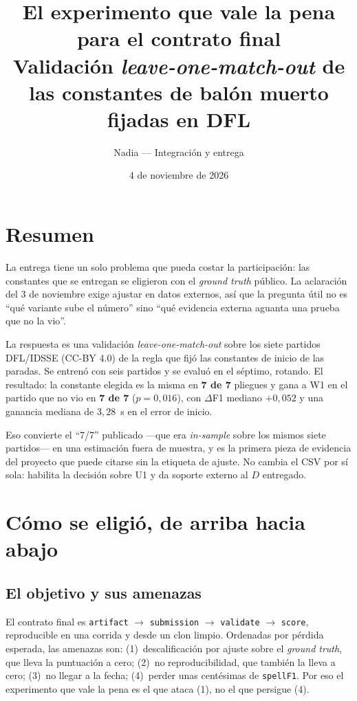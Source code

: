 \documentclass[11pt,a4paper]{article}
\title{El experimento que vale la pena para el contrato final\\
\large Validación \emph{leave-one-match-out} de las constantes de balón muerto fijadas en DFL}
\author{Nadia --- Integración y entrega}
\date{4 de noviembre de 2026}
\begin{document}
\maketitle

\section{Resumen}

La entrega tiene un solo problema que pueda costar la participación: las constantes que se
entregan se eligieron con el \emph{ground truth} público. La aclaración del 3 de noviembre exige
ajustar en datos externos, así que la pregunta útil no es ``qué variante sube el número'' sino
``qué evidencia externa aguanta una prueba que no la vio''.

La respuesta es una validación \emph{leave-one-match-out} sobre los siete partidos DFL/IDSSE
(CC-BY 4.0) de la regla que fijó las constantes de inicio de las paradas. Se entrenó con seis
partidos y se evaluó en el séptimo, rotando. El resultado: la constante elegida es la misma en
\textbf{7 de 7} pliegues y gana a W1 en el partido que no vio en \textbf{7 de 7} ($p=0{,}016$),
con $\Delta$F1 mediano $+0{,}052$ y una ganancia mediana de $3{,}28$~s en el error de inicio.

Eso convierte el ``7/7'' publicado ---que era \emph{in-sample} sobre los mismos siete
partidos--- en una estimación fuera de muestra, y es la primera pieza de evidencia del proyecto
que puede citarse sin la etiqueta de ajuste. No cambia el CSV por sí sola: habilita la decisión
sobre U1 y da soporte externo al $D$ entregado.

\section{Cómo se eligió, de arriba hacia abajo}

\subsection*{El objetivo y sus amenazas}

El contrato final es \texttt{artifact} $\rightarrow$ \texttt{submission} $\rightarrow$
\texttt{validate} $\rightarrow$ \texttt{score}, reproducible en una corrida y desde un clon
limpio. Ordenadas por pérdida esperada, las amenazas son: (1)~descalificación por ajuste sobre
el \emph{ground truth}, que lleva la puntuación a cero; (2)~no reproducibilidad, que también la
lleva a cero; (3)~no llegar a la fecha; (4)~perder unas centésimas de \texttt{spellF1}. Por eso
el experimento que vale la pena es el que ataca (1), no el que persigue (4).
\end{document}
